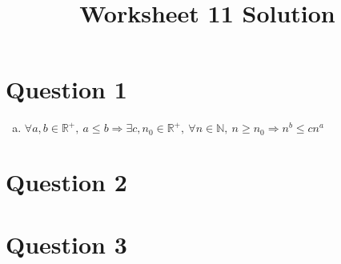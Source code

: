 \documentclass[12pt]{article}
\begin{document}
\title{Worksheet 11 Solution}
\maketitle

\section*{Question 1}
\begin{enumerate}[a.]
    \item

    $\forall a,b \in \mathbb{R}^{+},\: a \leq b \Rightarrow \exists c,n_0 \in \mathbb{R}^{+},
    \:\forall n \in \mathbb{N},\: n \geq n_0 \Rightarrow n^b \leq cn^a$
\end{enumerate}

\section*{Question 2}

\section*{Question 3}
\end{document}
